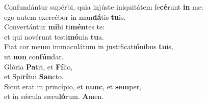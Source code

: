 \evenverse Confundántur supérbi, quia injúste iniquitátem fe\textbf{cé}runt \textbf{in} me:~\*\\
\evenverse ego autem exercébor in man\textbf{dá}tis \textbf{tu}is.\\
\oddverse Convertántur \textbf{mi}hi ti\textbf{mén}tes te:~\*\\
\oddverse et qui novérunt testi\textbf{mó}nia \textbf{tu}a.\\
\evenverse Fiat cor meum immaculátum in justificati\textbf{ó}nibus \textbf{tu}is,~\*\\
\evenverse ut \textbf{non} con\textbf{fún}dar.\\
\oddverse Glória \textbf{Pa}tri, et \textbf{Fí}lio,~\*\\
\oddverse et Spi\textbf{rí}tui \textbf{San}cto.\\
\evenverse Sicut erat in princípio, et \textbf{nunc}, et \textbf{sem}per,~\*\\
\evenverse et in sǽcula sæcu\textbf{ló}rum. \textbf{A}men.\\
